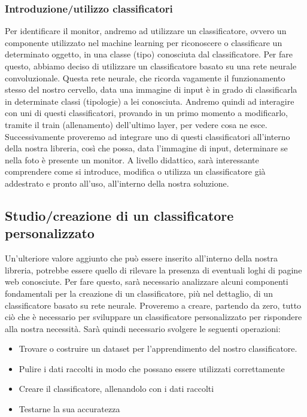 \documentclass[twoside]{supsistudent}
\newcommand{\Decaa}{\newline\vspace{0.5mm}\newline\noindent}
\begin{document}
\subsubsection{Introduzione/utilizzo classificatori}
Per identificare il monitor, andremo ad utilizzare un classificatore, ovvero un componente utilizzato nel machine learning per riconoscere o classificare un determinato oggetto, in una classe (tipo) conosciuta dal classificatore.
\Decaa Per fare questo, abbiamo deciso di utilizzare un classificatore basato su una rete neurale convoluzionale. Questa rete neurale, che ricorda vagamente il funzionamento stesso del nostro cervello, data una immagine di input è in grado di classificarla in determinate classi (tipologie) a lei conosciuta.
\Decaa
Andremo quindi ad interagire con uni di questi classificatori, provando in un primo momento a modificarlo, tramite il train (allenamento) dell'ultimo layer, per vedere cosa ne esce. Successivamente proveremo ad integrare uno di questi classificatori all'interno della nostra libreria, così che possa, data l'immagine di input, determinare se nella foto è presente un monitor.
\Decaa
A livello didattico, sarà interessante comprendere come si introduce, modifica o utilizza un classificatore già addestrato e pronto all'uso, all'interno della nostra soluzione.

\subsection{Studio/creazione di un classificatore personalizzato}
Un'ulteriore valore aggiunto che può essere inserito all'interno della nostra libreria, potrebbe essere quello di rilevare la presenza di eventuali loghi di pagine web conosciute. Per fare questo, sarà necessario analizzare alcuni componenti fondamentali per la creazione di un classificatore, più nel dettaglio, di un classificatore basato su rete neurale.\Decaa
Proveremo a creare, partendo da zero, tutto ciò che è necessario per sviluppare un classificatore personalizzato per rispondere alla nostra necessità. Sarà quindi necessario svolgere le seguenti operazioni:
\begin{itemize}
\item Trovare o costruire un dataset per l'apprendimento del nostro classificatore.
\item Pulire i dati raccolti in modo che possano essere utilizzati correttamente
\item Creare il classificatore, allenandolo con i dati raccolti
\item Testarne la sua accuratezza
\end{itemize}
\end{document}

